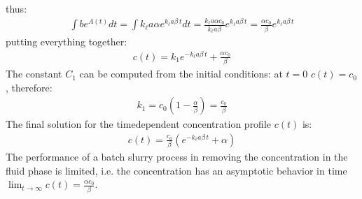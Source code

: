\documentclass[letterpaper,10pt,english]{jupyterBook}
\begin{document}
\sphinxAtStartPar
thus:
\begin{equation}\label{equation:Slurry_Adsorption:slurryeq8}
\begin{split}
\int{be^{A(t)}dt}=\int{k_\ell{a\alpha}e^{k_\ell{a\beta}\,t}dt}=\frac{k_\ell{a\alpha}c_0}{k_\ell{a\beta}}e^{k_\ell{a\beta}\,t}=\frac{\alpha{c_0}}{\beta}e^{k_\ell{a\beta}\,t}
\end{split}
\end{equation}
\sphinxAtStartPar
putting everything together:
\begin{equation}\label{equation:Slurry_Adsorption:slurryeq9}
\begin{split}
c(t)=k_1e^{-k_\ell{a\beta}\,t}+\frac{\alpha{c_0}}{\beta}
\end{split}
\end{equation}
\sphinxAtStartPar
The constant \(C_1\) can be computed from the initial conditions: at \(t=0\) \(c(t)=c_0\), therefore:
\begin{equation}\label{equation:Slurry_Adsorption:slurryeq10}
\begin{split}
k_1=c_0\left(1-\frac{\alpha}{\beta}\right)=\frac{c_0}{\beta}
\end{split}
\end{equation}
\sphinxAtStartPar
The final solution for the time\sphinxhyphen{}dependent concentration profile \(c(t)\) is:
\begin{equation}\label{equation:Slurry_Adsorption:slurryeq11}
\begin{split}
c(t)=\frac{c_0}{\beta}\left(e^{-k_\ell{a\beta}\,t}+\alpha\right)
\end{split}
\end{equation}
\sphinxAtStartPar
The performance of a batch slurry process in removing the concentration in the fluid phase is limited, i.e. the concentration has an asymptotic behavior in time \(\lim_{t\to\infty} c(t) = \frac{\alpha{c_0}}{\beta}\).
\end{document}
